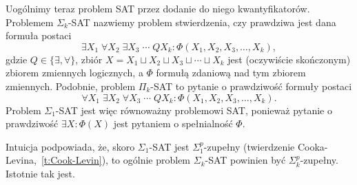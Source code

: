 Uogólnimy teraz problem SAT przez dodanie do niego kwantyfikatorów. Problemem $\Sigma_k$-SAT nazwiemy problem stwierdzenia, czy prawdziwa jest dana formuła postaci
\[ \exists X_1\; \forall X_2\; \exists X_3\; \cdots\; Q X_k : \Phi\left(X_1, X_2, X_3, \ldots, X_k\right), \]
gdzie $Q \in \{\exists, \forall\}$, zbiór $X = X_1 \sqcup X_2 \sqcup X_3 \sqcup \cdots \sqcup X_k$ jest (oczywiście skończonym) zbiorem zmiennych logicznych, a $\Phi$ formułą zdaniową nad tym zbiorem zmiennych.
Podobnie, problem $\Pi_k$-SAT to pytanie o prawdziwość formuły postaci
\[ \forall X_1\; \exists X_2\; \forall X_3\; \cdots\; Q X_k : \Phi\left(X_1, X_2, X_3, \ldots, X_k\right). \]
Problem $\Sigma_1$-SAT jest więc równoważny problemowi SAT, ponieważ pytanie o prawdziwość $\exists X : \Phi(X)$ jest pytaniem o spełnialność $\Phi$.

Intuicja podpowiada, że, skoro $\Sigma_1$-SAT jest $\Sigma_1^p$-zupełny (twierdzenie Cooka-Levina,~\ref{t:Cook-Levin}), to ogólnie problem $\Sigma_k$-SAT powinien być $\Sigma_k^p$-zupełny. Istotnie tak jest.

